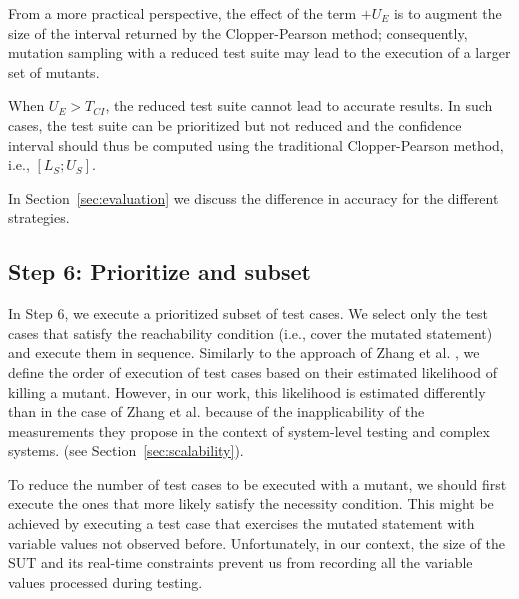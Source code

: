  {From a more practical perspective, the effect of the term $+\mathit{U}_{E}$ is to augment the size of the interval returned by the Clopper-Pearson method; consequently, mutation sampling with a reduced test suite may lead to the execution of a larger set of mutants.}

 {When $\mathit{U}_{E}>T_{\mathit{CI}}$, the reduced test suite cannot lead to accurate results. In such cases, the test suite can be prioritized but not reduced and the confidence interval should thus be computed using the traditional Clopper-Pearson method, i.e., $[\mathit{L}_{S};\mathit{U}_{S}]$.}

 {In Section~\ref{sec:evaluation} we discuss the difference in accuracy for the different strategies.}

\ENDCHANGEDNOV

\subsection{Step 6: Prioritize and subset}
\label{sec:step:prioritize}

In Step 6, we execute a prioritized subset of test cases. 
We select only the test cases that satisfy 
the reachability condition (i.e., cover the mutated statement) and  execute them in sequence.
Similarly to the approach of Zhang et al. \cite{zhang2013faster}, we define the order of execution of test cases based on their estimated likelihood of killing a mutant.
 {However, in our work, this likelihood is estimated differently than in the case of Zhang et al. because of the inapplicability of the measurements they propose in the context of system-level testing and complex systems. 
(see Section~\ref{sec:scalability}).}



To reduce the number of test cases to be executed with a mutant, 
we should first execute the ones that more likely satisfy the necessity condition. 
This might be achieved by executing a test case that exercises the mutated statement with variable values not observed before. 
Unfortunately, in our context, the size of the SUT and its real-time constraints prevent us from recording all the variable values processed during testing. 

